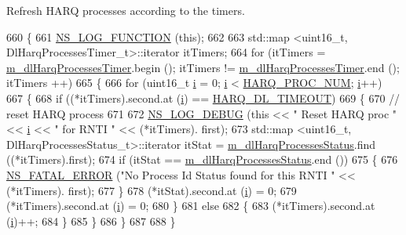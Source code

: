 Refresh H\+A\+RQ processes according to the timers. 


\begin{DoxyCode}
660 \{
661   \hyperlink{log-macros-disabled_8h_a90b90d5bad1f39cb1b64923ea94c0761}{NS\_LOG\_FUNCTION} (\textcolor{keyword}{this});
662 
663   std::map <uint16\_t, DlHarqProcessesTimer\_t>::iterator itTimers;
664   \textcolor{keywordflow}{for} (itTimers = \hyperlink{classns3_1_1TdTbfqFfMacScheduler_a772806188cbe19e816a9eab534733ee1}{m\_dlHarqProcessesTimer}.begin (); itTimers != 
      \hyperlink{classns3_1_1TdTbfqFfMacScheduler_a772806188cbe19e816a9eab534733ee1}{m\_dlHarqProcessesTimer}.end (); itTimers ++)
665     \{
666       \textcolor{keywordflow}{for} (uint16\_t \hyperlink{bernuolliDistribution_8m_a6f6ccfcf58b31cb6412107d9d5281426}{i} = 0; \hyperlink{bernuolliDistribution_8m_a6f6ccfcf58b31cb6412107d9d5281426}{i} < \hyperlink{cqa-ff-mac-scheduler_8h_a9185d8d7d2b2979181d4a7044a3d3555}{HARQ\_PROC\_NUM}; \hyperlink{bernuolliDistribution_8m_a6f6ccfcf58b31cb6412107d9d5281426}{i}++)
667         \{
668           \textcolor{keywordflow}{if} ((*itTimers).second.at (\hyperlink{bernuolliDistribution_8m_a6f6ccfcf58b31cb6412107d9d5281426}{i}) == \hyperlink{cqa-ff-mac-scheduler_8h_add9e0c4889dc1b5b25686480b31ad166}{HARQ\_DL\_TIMEOUT})
669             \{
670               \textcolor{comment}{// reset HARQ process}
671               
672               \hyperlink{group__logging_ga413f1886406d49f59a6a0a89b77b4d0a}{NS\_LOG\_DEBUG} (\textcolor{keyword}{this} << \textcolor{stringliteral}{" Reset HARQ proc "} << \hyperlink{bernuolliDistribution_8m_a6f6ccfcf58b31cb6412107d9d5281426}{i} << \textcolor{stringliteral}{" for RNTI "} << (*itTimers).
      first);
673               std::map <uint16\_t, DlHarqProcessesStatus\_t>::iterator itStat = 
      \hyperlink{classns3_1_1TdTbfqFfMacScheduler_a3d25806fc0b4360d668951f3a6b96b8d}{m\_dlHarqProcessesStatus}.find ((*itTimers).first);
674               \textcolor{keywordflow}{if} (itStat == \hyperlink{classns3_1_1TdTbfqFfMacScheduler_a3d25806fc0b4360d668951f3a6b96b8d}{m\_dlHarqProcessesStatus}.end ())
675                 \{
676                   \hyperlink{group__fatal_ga5131d5e3f75d7d4cbfd706ac456fdc85}{NS\_FATAL\_ERROR} (\textcolor{stringliteral}{"No Process Id Status found for this RNTI "} << (*itTimers).
      first);
677                 \}
678               (*itStat).second.at (\hyperlink{bernuolliDistribution_8m_a6f6ccfcf58b31cb6412107d9d5281426}{i}) = 0;
679               (*itTimers).second.at (\hyperlink{bernuolliDistribution_8m_a6f6ccfcf58b31cb6412107d9d5281426}{i}) = 0;
680             \}
681           \textcolor{keywordflow}{else}
682             \{
683               (*itTimers).second.at (\hyperlink{bernuolliDistribution_8m_a6f6ccfcf58b31cb6412107d9d5281426}{i})++;
684             \}
685         \}
686     \}
687   
688 \}
\end{DoxyCode}


